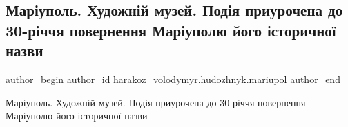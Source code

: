  
 
 
 
 

\subsection{Маріуполь. Художній музей. Подія приурочена до 30-річчя повернення Маріуполю його історичної назви}
\label{sec:28_12_2017.fb.harakoz_volodymyr.hudozhnyk.mariupol.1.vystavka_muzej_30_rokiv_nazva}

\ifcmt
 author_begin
   author_id harakoz_volodymyr.hudozhnyk.mariupol
 author_end
\fi

Маріуполь. Художній музей. Подія приурочена до 30-річчя повернення Маріуполю
його історичної назви

